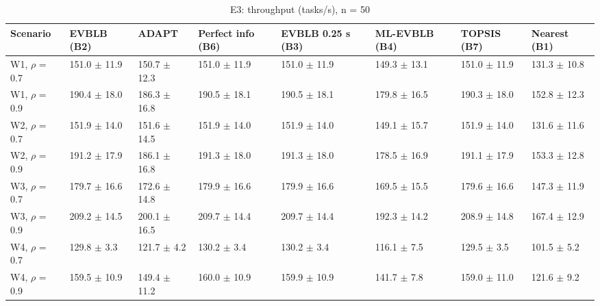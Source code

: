 \begin{table}[t]
\centering
\footnotesize
\caption{E3: throughput (tasks/s), n = 50}
\label{tab:e3_throughput}
\begin{tabular}{llllllll}
\toprule
Scenario & EVBLB (B2) & ADAPT & Perfect info (B6) & EVBLB 0.25 s (B3) & ML-EVBLB (B4) & TOPSIS (B7) & Nearest (B1) \\
\midrule
W1, $\rho$ = 0.7 & 151.0 $\pm$ 11.9 & 150.7 $\pm$ 12.3 & 151.0 $\pm$ 11.9 & 151.0 $\pm$ 11.9 & 149.3 $\pm$ 13.1 & 151.0 $\pm$ 11.9 & 131.3 $\pm$ 10.8 \\
W1, $\rho$ = 0.9 & 190.4 $\pm$ 18.0 & 186.3 $\pm$ 16.8 & 190.5 $\pm$ 18.1 & 190.5 $\pm$ 18.1 & 179.8 $\pm$ 16.5 & 190.3 $\pm$ 18.0 & 152.8 $\pm$ 12.3 \\
W2, $\rho$ = 0.7 & 151.9 $\pm$ 14.0 & 151.6 $\pm$ 14.5 & 151.9 $\pm$ 14.0 & 151.9 $\pm$ 14.0 & 149.1 $\pm$ 15.7 & 151.9 $\pm$ 14.0 & 131.6 $\pm$ 11.6 \\
W2, $\rho$ = 0.9 & 191.2 $\pm$ 17.9 & 186.1 $\pm$ 16.8 & 191.3 $\pm$ 18.0 & 191.3 $\pm$ 18.0 & 178.5 $\pm$ 16.9 & 191.1 $\pm$ 17.9 & 153.3 $\pm$ 12.8 \\
W3, $\rho$ = 0.7 & 179.7 $\pm$ 16.6 & 172.6 $\pm$ 14.8 & 179.9 $\pm$ 16.6 & 179.9 $\pm$ 16.6 & 169.5 $\pm$ 15.5 & 179.6 $\pm$ 16.6 & 147.3 $\pm$ 11.9 \\
W3, $\rho$ = 0.9 & 209.2 $\pm$ 14.5 & 200.1 $\pm$ 16.5 & 209.7 $\pm$ 14.4 & 209.7 $\pm$ 14.4 & 192.3 $\pm$ 14.2 & 208.9 $\pm$ 14.8 & 167.4 $\pm$ 12.9 \\
W4, $\rho$ = 0.7 & 129.8 $\pm$ 3.3 & 121.7 $\pm$ 4.2 & 130.2 $\pm$ 3.4 & 130.2 $\pm$ 3.4 & 116.1 $\pm$ 7.5 & 129.5 $\pm$ 3.5 & 101.5 $\pm$ 5.2 \\
W4, $\rho$ = 0.9 & 159.5 $\pm$ 10.9 & 149.4 $\pm$ 11.2 & 160.0 $\pm$ 10.9 & 159.9 $\pm$ 10.9 & 141.7 $\pm$ 7.8 & 159.0 $\pm$ 11.0 & 121.6 $\pm$ 9.2 \\
\bottomrule
\end{tabular}
\end{table}
